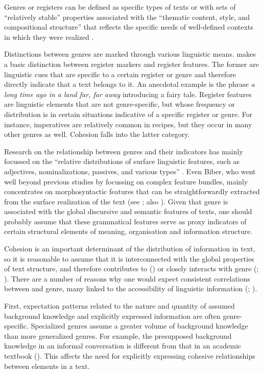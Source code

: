 \documentclass[output=paper
,modfonts
,nonflat]{langsci/langscibook}
\begin{document}
Genres or registers can be defined as specific types of texts or  with sets of “relatively stable” properties associated with the “thematic content, style, and compositional structure” that reflects the specific needs of well-defined contexts in which they were realized \citep[60]{Bakhtin1986}.

Distinctions between genres are marked through various linguistic means. \citet[28]{Biber1995} makes a basic distinction between register markers and register features. The former are linguistic cues that are specific to a certain register or genre and therefore directly indicate that a text belongs to it. An anecdotal example is the phrase \textit{a long time ago in a land far, far away} introducing a fairy tale. Register features are linguistic elements that are not genre-specific, but whose frequency or distribution is in certain situations indicative of a specific register or genre. For instance, imperatives are relatively common in recipes, but they occur in many other genres as well. Cohesion falls into the latter category.

Research on the relationship between genres and their indicators has mainly focussed on the “relative distributions of surface linguistic features, such as adjectives, nominalizations, passives, and various  types” \citep[12]{Biber1995}. Even Biber, who went well beyond previous studies by focussing on complex feature bundles, mainly concentrates on morphosyntactic features that can be straightforwardly extracted from the surface realization of the text (see \citealt[94–104]{Biber1995}; also \citealt[217–226]{Biber2009}). Given that genre is associated with the global discursive and semantic features of texts, one should probably assume that these grammatical features serve as proxy indicators of certain structural elements of meaning,  organisation and information structure.

Cohesion is an important determinant of the distribution of information in text, so it is reasonable to assume that it is interconnected with the global properties of text structure, and therefore contributes to (\citealt{Halliday1976}) or closely interacts with genre (\citealt{Martin1992}; \citealt{Martin2001}). There are a number of reasons why one would expect consistent correlations between  and genre, many linked to the accessibility of linguistic information (\citealt[74–116]{Lambrecht1994}; \citealt{Ariel1991}).

First, expectation patterns related to the nature and quantity of assumed background knowledge and explicitly expressed information are often genre-specific. Specialized genres assume a greater volume of background knowledge than more generalized genres. For example, the presupposed background knowledge in an informal conversation is different from that in an academic textbook (\citealt[14–15]{Biber2009}). This affects the need for explicitly expressing cohesive relationships between elements in a text.\largerpage[-1] 
\end{document}
